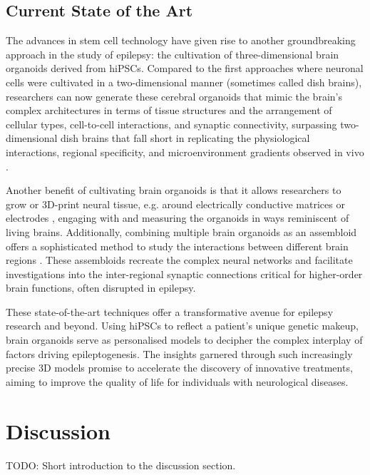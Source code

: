 \documentclass[10pt]{article}
\begin{document}
\begin{sloppypar}
  \subsection{Current State of the Art}
  \label{sec:current-state-of-the-art}

  The advances in stem cell technology have given rise to another groundbreaking approach in the study of epilepsy: the cultivation of three-dimensional brain organoids derived from hiPSCs. Compared to the first approaches where neuronal cells were cultivated in a two-dimensional manner (sometimes called dish brains), researchers can now generate these cerebral organoids that mimic the brain’s complex architectures in terms of tissue structures and the arrangement of cellular types, cell-to-cell interactions, and synaptic connectivity, surpassing two-dimensional dish brains that fall short in replicating the physiological interactions, regional specificity, and microenvironment gradients observed in vivo \citep{clevers_modeling_2016, wang_modeling_2018}.

  Another benefit of cultivating brain organoids is that it allows researchers to grow or 3D-print neural tissue, e.g. around electrically conductive matrices or electrodes \citep{yao_3d_2023}, engaging with and measuring the organoids in ways reminiscent of living brains. Additionally, combining multiple brain organoids as an assembloid offers a sophisticated method to study the interactions between different brain regions \citep{sloan_generation_2018}. These assembloids recreate the complex neural networks and facilitate investigations into the inter-regional synaptic connections critical for higher-order brain functions, often disrupted in epilepsy.

  These state-of-the-art techniques offer a transformative avenue for epilepsy research and beyond. Using hiPSCs to reflect a patient’s unique genetic makeup, brain organoids serve as personalised models to decipher the complex interplay of factors driving epileptogenesis. The insights garnered through such increasingly precise 3D models promise to accelerate the discovery of innovative treatments, aiming to improve the quality of life for individuals with neurological diseases.


  \section{Discussion}
  \label{sec:discussion}

  TODO: Short introduction to the discussion section.


\end{sloppypar}
\end{document}

